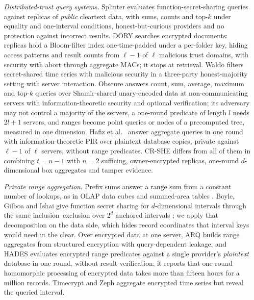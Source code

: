 \emph{Distributed-trust query systems.} Splinter \citep{splinter} evaluates
function-secret-sharing queries against replicas of \emph{public} cleartext
data, with sums, counts and top-$k$ under equality and one-interval conditions,
honest-but-curious providers and no protection against incorrect results.
DORY \citep{dory} searches encrypted documents: replicas hold a Bloom-filter
index one-time-padded under a per-folder key, hiding access patterns and result
counts from $\ell-1$ of $\ell$ malicious trust domains, with security with
abort through aggregate MACs; it stops at retrieval. Waldo \citep{waldo}
filters secret-shared time series with malicious security in a three-party
honest-majority setting with server interaction. Obscure
\citep{gupta2019obscure,gupta2020obscure} answers count, sum, average, maximum
and top-$k$ queries over Shamir-shared unary-encoded data at non-communicating
servers with information-theoretic security and optional verification; its
adversary may not control a majority of the servers, a one-round predicate of
length $l$ needs $2l+1$ servers, and ranges become point queries or nodes of a
precomputed tree, measured in one dimension. Hafiz et al.\
\citep{hafiz2024private} answer aggregate queries in one round with
information-theoretic PIR over plaintext database copies, private against
$\ell-1$ of $\ell$ servers, without range predicates. CR-SHE differs from all
of them in combining $t=n-1$ with $n=2$ sufficing, owner-encrypted replicas,
one-round $d$-dimensional box aggregates and tamper evidence.

\emph{Private range aggregation.} Prefix sums answer a range sum from a
constant number of lookups, as in OLAP data cubes \citep{ho1997range} and
summed-area tables \citep{crow1984summed}. Boyle, Gilboa and Ishai give
function secret sharing for $d$-dimensional intervals through the same
inclusion--exclusion over $2^d$ anchored intervals
\citep[Cor.~3.4]{boyle2016function}; we apply that decomposition on the data
side, which hides record coordinates that interval keys would need in the
clear. Over encrypted data at one server, ARQ \citep{espiritu2022arq} builds
range aggregates from structured encryption with query-dependent leakage, and
HADES \citep{liu2025hades} evaluates encrypted range predicates against a
single provider's \emph{plaintext} database in one round, without result
verification; it reports that one-round homomorphic processing of encrypted
data takes more than fifteen hours for a million records. Timecrypt
\citep{timecrypt} and Zeph \citep{zeph} aggregate encrypted time series but
reveal the queried interval.

